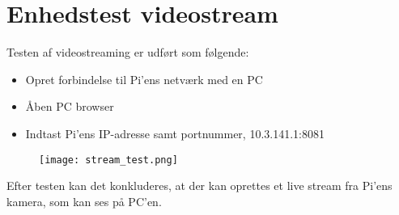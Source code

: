 %
%

\chapter{Enhedstest videostream}
\label{appendix:Bilag_enhedstest_videostream}

Testen af videostreaming er udført som følgende: 

\begin{itemize}
	\item Opret forbindelse til Pi'ens netværk med en PC
	\item Åben PC browser
	\item Indtast Pi'ens IP-adresse samt portnummer, 10.3.141.1:8081
\end{itemize}


\begin{figure} [H]
	\centering
	\texttt{[image: stream\_test.png]}
	\label{fig:stream_test}
\end{figure}

Efter testen kan det konkluderes, at der kan oprettes et live stream fra Pi'ens kamera, som kan ses på PC'en. 

%